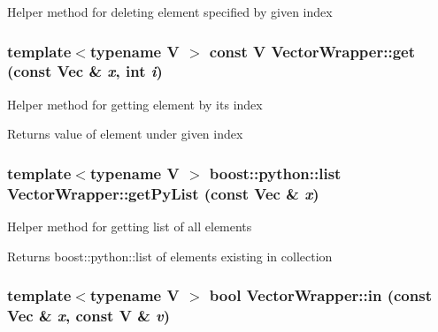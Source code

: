 \label{struct_stl_containers_wrappers_1_1_vector_wrapper_a40311c89e3818c22ad283161f0417bca}
Helper method for deleting element specified by given index \hypertarget{struct_stl_containers_wrappers_1_1_vector_wrapper_a1b0e383dae79f32239a863cf7398f267}{
\subsubsection[{get}]{\setlength{\rightskip}{0pt plus 5cm}template$<$typename V $>$ const V VectorWrapper::get (const Vec \& {\em x}, \/  int {\em i})}}
\label{struct_stl_containers_wrappers_1_1_vector_wrapper_a1b0e383dae79f32239a863cf7398f267}
Helper method for getting element by its index \begin{DoxyReturn}{Returns}
value of element under given index 
\end{DoxyReturn}
\hypertarget{struct_stl_containers_wrappers_1_1_vector_wrapper_a4afc777d4230a26d5070ec4d542e7d36}{
\subsubsection[{getPyList}]{\setlength{\rightskip}{0pt plus 5cm}template$<$typename V $>$ boost::python::list VectorWrapper::getPyList (const Vec \& {\em x})}}
\label{struct_stl_containers_wrappers_1_1_vector_wrapper_a4afc777d4230a26d5070ec4d542e7d36}
Helper method for getting list of all elements \begin{DoxyReturn}{Returns}
boost::python::list of elements existing in collection 
\end{DoxyReturn}
\hypertarget{struct_stl_containers_wrappers_1_1_vector_wrapper_a3b81b39869a283c7879e928c0e5718ee}{
\subsubsection[{in}]{\setlength{\rightskip}{0pt plus 5cm}template$<$typename V $>$ bool VectorWrapper::in (const Vec \& {\em x}, \/  const V \& {\em v})}}
